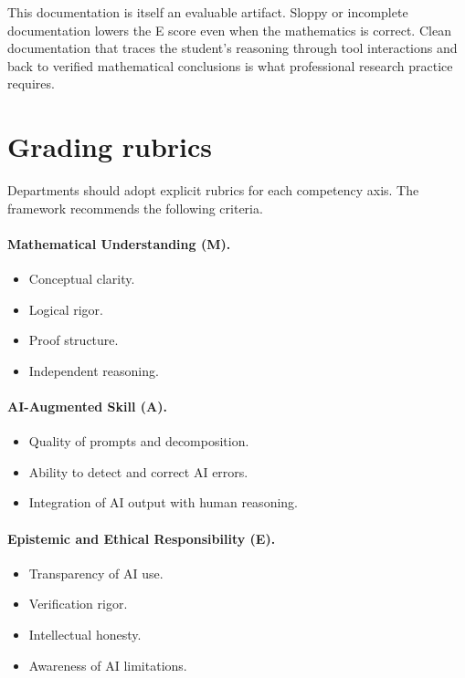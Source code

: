 \documentclass{SIAMbook2023}
\begin{document}
This documentation is itself an evaluable artifact. Sloppy or incomplete documentation lowers the E score even when the mathematics is correct. Clean documentation that traces the student's reasoning through tool interactions and back to verified mathematical conclusions is what professional research practice requires.

\section{Grading rubrics}

Departments should adopt explicit rubrics for each competency axis. The framework recommends the following criteria.

\paragraph{Mathematical Understanding (M).}
\begin{itemize}
\item Conceptual clarity.
\item Logical rigor.
\item Proof structure.
\item Independent reasoning.
\end{itemize}

\paragraph{AI-Augmented Skill (A).}
\begin{itemize}
\item Quality of prompts and decomposition.
\item Ability to detect and correct AI errors.
\item Integration of AI output with human reasoning.
\end{itemize}

\paragraph{Epistemic and Ethical Responsibility (E).}
\begin{itemize}
\item Transparency of AI use.
\item Verification rigor.
\item Intellectual honesty.
\item Awareness of AI limitations.
\end{itemize}
\end{document}
